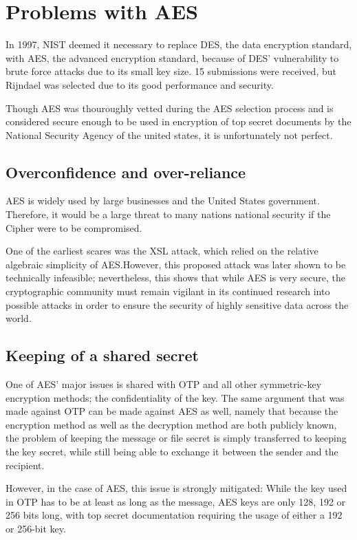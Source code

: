 \documentclass[12pt]{report}
\theoremstyle{definition}
\theoremstyle{remark}
\begin{document}
\section{Problems with AES}
In 1997, NIST deemed it necessary to replace DES, the data encryption standard, with AES, the advanced encryption standard, because of DES' vulnerability to brute force attacks due to its small key size. 15 submissions were received, but Rijndael was selected due to its good performance and security\cite{AESSelection}.

Though AES was thouroughly vetted during the AES selection process and is considered secure enough to be used in encryption of top secret documents by the National Security Agency\cite{CNSSPolicy} of the united states, it is unfortunately not perfect.

\subsection{Overconfidence and over-reliance}
AES is widely used by large businesses and the United States government. Therefore, it would be a large threat to many nations national security if the Cipher were to be compromised.

One of the earliest scares was the XSL attack, which relied on the relative algebraic simplicity of AES\cite{XSL}.However, this proposed attack was later shown to be technically infeasible\cite{XLSRebuked}; nevertheless, this shows that while AES is very secure, the cryptographic community must remain vigilant in its continued research into possible attacks in order to ensure the security of highly sensitive data across the world.

\subsection{Keeping of a shared secret}
One of AES' major issues is shared with OTP and all other symmetric-key encryption methods; the confidentiality of the key. The same argument that was made against OTP can be made against AES as well, namely that because the encryption method as well as the decryption method are both publicly known, the problem of keeping the message or file secret is simply transferred to keeping the key secret, while still being able to exchange it between the sender and the recipient.

However, in the case of AES, this issue is strongly mitigated: While the key used in OTP has to be at least as long as the message, AES keys are only 128, 192 or 256 bits long, with top secret documentation requiring the usage of either a 192 or 256-bit key\cite{CNSSPolicy}.
\end{document}
